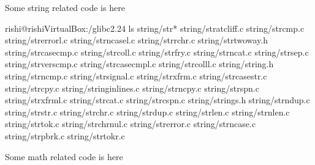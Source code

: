 \documentclass[letterpaper,10pt,english]{sphinxmanual}
\begin{document}
Some string related code is here

\begin{sphinxVerbatim}[commandchars=\\\{\}]
rishi@rishi\PYGZhy{}VirtualBox:\PYGZti{}/glibc\PYGZhy{}2.24\PYGZdl{} ls string/str*
string/stratcliff.c    string/strcmp.c     string/strerror\PYGZus{}l.c      string/strncase\PYGZus{}l.c  string/strrchr.c    string/str\PYGZhy{}two\PYGZhy{}way.h
string/strcasecmp.c    string/strcoll.c    string/strfry.c          string/strncat.c     string/strsep.c     string/strverscmp.c
string/strcasecmp\PYGZus{}l.c  string/strcoll\PYGZus{}l.c  string/string.h          string/strncmp.c     string/strsignal.c  string/strxfrm.c
string/strcasestr.c    string/strcpy.c     string/string\PYGZhy{}inlines.c  string/strncpy.c     string/strspn.c     string/strxfrm\PYGZus{}l.c
string/strcat.c        string/strcspn.c    string/strings.h         string/strndup.c     string/strstr.c
string/strchr.c        string/strdup.c     string/strlen.c          string/strnlen.c     string/strtok.c
string/strchrnul.c     string/strerror.c   string/strncase.c        string/strpbrk.c     string/strtok\PYGZus{}r.c
\end{sphinxVerbatim}

Some math related code is here
\end{document}
